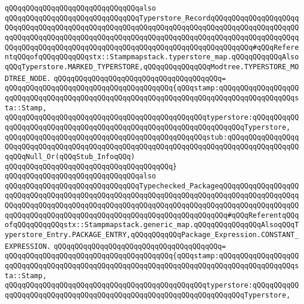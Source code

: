 \newline
\newline
\verb|qQQqqQQqqQQqqQQqqQQqqQQqqQQqqQQqalso|\newline
\verb|qQQqqQQqqQQqqQQqqQQqqQQqqQQqqQQqTyperstore_RecordqQQqqQQqqQQqqQQqqQQqqQQqqQQqqQQqqQQqqQQqqQQqqQQqqQQqqQQqqQQqqQQqqQQqqQQqqQQqqQQqqQQqqQQqqQQqqQQqqQQqqQQqqQQqqQQqqQQqqQQqqQQqqQQqqQQqqQQqqQQqqQQqqQQqqQQqqQQqqQQqqQQqqQQqqQQqqQQqqQQqqQQqqQQqqQQqqQQqqQQqqQQqqQQqqQQqqQQqqQQq#qQQqReferentqQQqofqQQqqQQqqQQqstx::Stampmapstack.typerstore_map.qQQqqQQqqQQqAlsoqQQqTyperstore.MARKED_TYPERSTORE,qQQqqQQqqQQqqQQqModtree.TYPERSTORE_MODTREE_NODE.|\newline
\verb|qQQqqQQqqQQqqQQqqQQqqQQqqQQqqQQqqQQqqQQq=|\newline
\verb|qQQqqQQqqQQqqQQqqQQqqQQqqQQqqQQqqQQqqQQq{qQQqstamp:qQQqqQQqqQQqqQQqqQQqqQQqqQQqqQQqqQQqqQQqqQQqqQQqqQQqqQQqqQQqqQQqqQQqqQQqqQQqqQQqqQQqqQQqsta::Stamp,|\newline
\verb|qQQqqQQqqQQqqQQqqQQqqQQqqQQqqQQqqQQqqQQqqQQqqQQqtyperstore:qQQqqQQqqQQqqQQqqQQqqQQqqQQqqQQqqQQqqQQqqQQqqQQqqQQqqQQqqQQqqQQqqQQqTyperstore,|\newline
\verb|qQQqqQQqqQQqqQQqqQQqqQQqqQQqqQQqqQQqqQQqqQQqqQQqstub:qQQqqQQqqQQqqQQqqQQqqQQqqQQqqQQqqQQqqQQqqQQqqQQqqQQqqQQqqQQqqQQqqQQqqQQqqQQqqQQqqQQqqQQqqQQqNull_Or(qQQqStub_InfoqQQq)|\newline
\verb|qQQqqQQqqQQqqQQqqQQqqQQqqQQqqQQqqQQqqQQq}|\newline
\newline
\newline
\newline
\verb|qQQqqQQqqQQqqQQqqQQqqQQqqQQqqQQqalso|\newline
\verb|qQQqqQQqqQQqqQQqqQQqqQQqqQQqqQQqTypechecked_PackageqQQqqQQqqQQqqQQqqQQqqQQqqQQqqQQqqQQqqQQqqQQqqQQqqQQqqQQqqQQqqQQqqQQqqQQqqQQqqQQqqQQqqQQqqQQqqQQqqQQqqQQqqQQqqQQqqQQqqQQqqQQqqQQqqQQqqQQqqQQqqQQqqQQqqQQqqQQqqQQqqQQqqQQqqQQqqQQqqQQqqQQqqQQqqQQqqQQqqQQqqQQqqQQqqQQq#qQQqReferentqQQqofqQQqqQQqqQQqstx::Stampmapstack.generic_map.qQQqqQQqqQQqqQQqAlsoqQQqTyperstore_Entry.PACKAGE_ENTRY,qQQqqQQqqQQqPackage_Expression.CONSTANT_EXPRESSION.|\newline
\verb|qQQqqQQqqQQqqQQqqQQqqQQqqQQqqQQqqQQqqQQq=|\newline
\verb|qQQqqQQqqQQqqQQqqQQqqQQqqQQqqQQqqQQqqQQq{qQQqstamp:qQQqqQQqqQQqqQQqqQQqqQQqqQQqqQQqqQQqqQQqqQQqqQQqqQQqqQQqqQQqqQQqqQQqqQQqqQQqqQQqqQQqqQQqsta::Stamp,|\newline
\verb|qQQqqQQqqQQqqQQqqQQqqQQqqQQqqQQqqQQqqQQqqQQqqQQqtyperstore:qQQqqQQqqQQqqQQqqQQqqQQqqQQqqQQqqQQqqQQqqQQqqQQqqQQqqQQqqQQqqQQqqQQqTyperstore,|\newline
